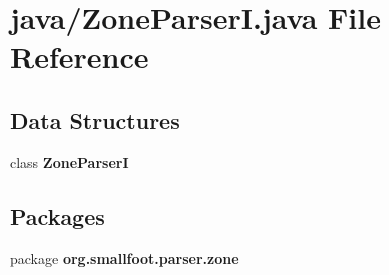 \section{java/\+Zone\+Parser\+I.java File Reference}
\label{ZoneParserI_8java}
\subsection*{Data Structures}
\begin{DoxyCompactItemize}
\item 
class {\bf Zone\+Parser\+I}
\end{DoxyCompactItemize}
\subsection*{Packages}
\begin{DoxyCompactItemize}
\item 
package {\bf org.\+smallfoot.\+parser.\+zone}
\end{DoxyCompactItemize}

